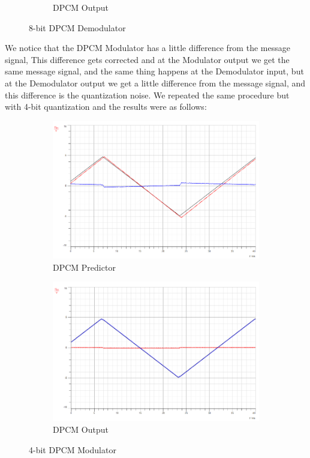 \documentclass[12pt]{article}
\begin{document}
\begin{figure}[H]
\begin{subfigure}[b]{0.32\textwidth}
        \caption{DPCM  Output}
    \end{subfigure}
    \caption{8-bit DPCM Demodulator}
\end{figure}

We notice that the DPCM Modulator has a little difference from the message signal, This difference gets corrected and at the Modulator output we get the same message signal, and the same thing happens at the Demodulator input, but at the Demodulator output we get a little difference from the message signal, and this difference is the quantization noise. We repeated the same procedure but with 4-bit quantization and the results were as follows:
\begin{figure}[H]
    \begin{subfigure}[b]{0.49\textwidth}
        \centering
        \includegraphics[width=\textwidth]{assets/main/2023-08-26-23-15-09.png}
        \caption{DPCM Predictor}
    \end{subfigure}
    \begin{subfigure}[b]{0.49\textwidth}
        \centering
        \includegraphics[width=\textwidth]{assets/main/2023-08-26-23-15-26.png}
        \caption{DPCM Output}
    \end{subfigure}
    \caption{4-bit DPCM Modulator}
\end{figure}
\end{document}
